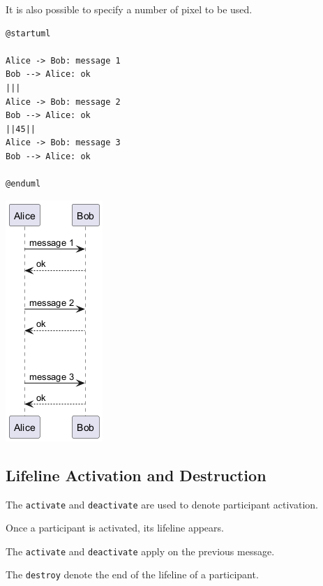 It is also possible to specify a number of pixel to be used.
\begin{verbatim}
@startuml

Alice -> Bob: message 1
Bob --> Alice: ok
|||
Alice -> Bob: message 2
Bob --> Alice: ok
||45||
Alice -> Bob: message 3
Bob --> Alice: ok

@enduml
\end{verbatim}
\begin{center}
\includegraphics[scale=0.60]{imgw/img-87f99d4e04d76ba558c014ff46a38f54.png}
\end{center}


%
%
\subsection{Lifeline Activation and Destruction}


The \texttt{activate} and \texttt{deactivate} are used to denote
participant activation.


Once a participant is activated, its lifeline appears.


The \texttt{activate} and \texttt{deactivate} apply on
the previous message.


The \texttt{destroy} denote the end of the lifeline of a
participant.


